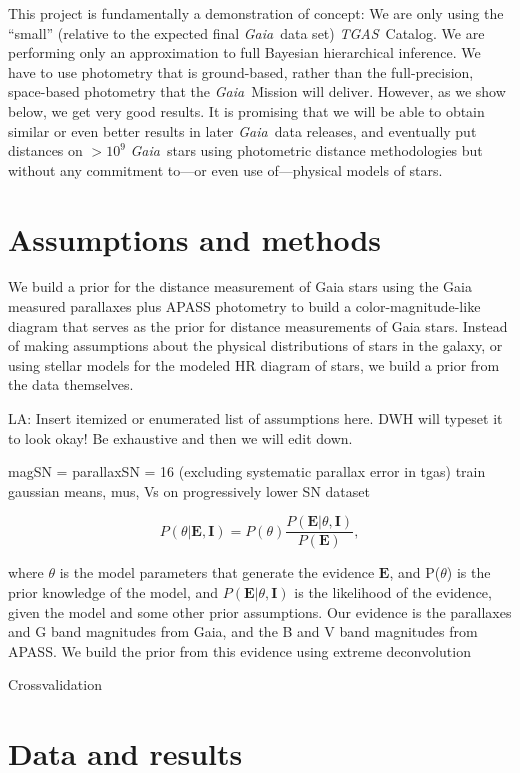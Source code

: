 \documentclass[12pt, preprint]{aastex6}
\newcommand{\acronym}[1]{{\small{#1}}}
\newcommand{\project}[1]{\textsl{#1}}
\newcommand{\tgas}{\project{\acronym{TGAS}}}
\newcommand{\gaia}{\project{Gaia}}
\begin{document}
This project is fundamentally a demonstration of concept:
We are only using the ``small'' (relative to the expected final \gaia\ data set)
\tgas\ Catalog.
We are performing only an approximation to full Bayesian hierarchical inference.
We have to use photometry that is ground-based, rather than the full-precision,
space-based photometry that the \gaia\ Mission will deliver.
However, as we show below, we get very good results.
It is promising that we will be able to obtain similar or even better results
in later \gaia\ data releases, and eventually put distances on $>10^9$
\gaia\ stars using photometric distance methodologies but without any
commitment to---or even use of---physical models of stars.

\section{Assumptions and methods}

We build a prior for the distance measurement of Gaia stars using the Gaia measured parallaxes plus APASS photometry to build a color-magnitude-like diagram that serves as the prior for distance measurements of Gaia stars. Instead of making assumptions about the physical distributions of stars in the galaxy, or using stellar models for the modeled HR diagram of stars, we build a prior from the data themselves.

LA: Insert itemized or enumerated list of assumptions here. DWH will
typeset it to look okay! Be exhaustive and then we will edit down.

magSN = parallaxSN = 16 (excluding systematic parallax error in tgas)
train gaussian means, mus, Vs on progressively lower SN dataset

\begin{equation}
\label{eq:bayes}
P(\theta|\textbf{E}, \textbf{I}) = P(\theta ) \frac{P(\textbf{E} |\theta,\textbf{I})}{P(\textbf{E})},
\end{equation}


where $\theta$ is the model parameters that generate the evidence $\textbf{E}$, and P($\theta$) is the prior knowledge of the model, and $P(\textbf{E} |\theta,\textbf{I})$ is the likelihood of the evidence, given the model and some other prior assumptions. Our evidence is the parallaxes and G band magnitudes from Gaia, and the B and V band magnitudes from APASS. We build the prior from this evidence using extreme deconvolution


Crossvalidation

\section{Data and results}
\end{document}
